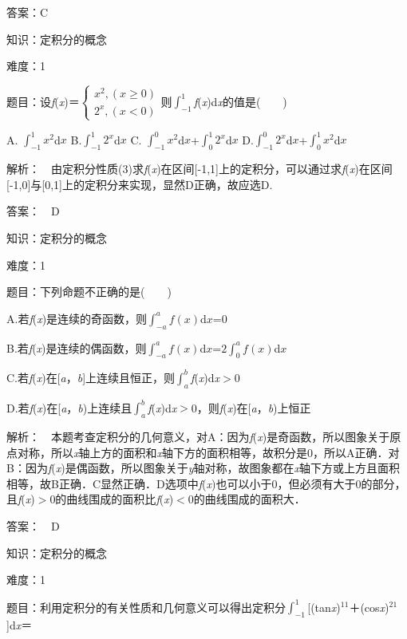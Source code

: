 \documentclass{article} %
\begin{document}
 答案：C



 知识：定积分的概念

 难度：1

 题目：设\textit{f}(\textit{x})＝$\left\{\begin{array}{l} x^2, (x\ge 0)\\ 2^x, (x<0) \end{array}\right.$则$\int_{-1}^1$\textit{f}(\textit{x})d\textit{x}的值是(　　)

A. $\int_{-1}^{1}x^2$d$x$   B.$\int_{-1}^{1}2^x$d$x$
C. $\int_{-1}^{0}x^2$d$x$+$\int_{0}^{1}2^x$d$x$    D.$\int_{-1}^{0}2^x$d$x$+$\int_{0}^{1}x^2$d$x$


 解析：　由定积分性质(3)求\textit{f}(\textit{x})在区间[-1,1]上的定积分，可以通过求\textit{f}(\textit{x})在区间[-1,0]与[0,1]上的定积分来实现，显然D正确，故应选D.

 答案：　D



 知识：定积分的概念

 难度：1

 题目：下列命题不正确的是(　　)

A.若\textit{f}(\textit{x})是连续的奇函数，则$\int_{-a}^{a}f(x)$d$x$=0

B.若\textit{f}(\textit{x})是连续的偶函数，则$\int_{-a}^{a}f(x)$d$x$=$2\int_0^a f(x)$d$x$

C.若\textit{f}(\textit{x})在[\textit{a}，\textit{b}]上连续且恒正，则$\int_a^b$\textit{f}(\textit{x})d\textit{x}$\mathrm{>}$0

D.若\textit{f}(\textit{x})在[\textit{a}，\textit{b})上连续且$\int_a^b$\textit{f}(\textit{x})d\textit{x}$\mathrm{>}$0，则\textit{f}(\textit{x})在[\textit{a}，\textit{b})上恒正

 解析：　本题考查定积分的几何意义，对A：因为\textit{f}(\textit{x})是奇函数，所以图象关于原点对称，所以\textit{x}轴上方的面积和\textit{x}轴下方的面积相等，故积分是0，所以A正确．对B：因为\textit{f}(\textit{x})是偶函数，所以图象关于\textit{y}轴对称，故图象都在\textit{x}轴下方或上方且面积相等，故B正确．C显然正确．D选项中\textit{f}(\textit{x})也可以小于0，但必须有大于0的部分，且\textit{f}(\textit{x})$\mathrm{>}$0的曲线围成的面积比\textit{f}(\textit{x})$\mathrm{<}$0的曲线围成的面积大．

 答案：　D



 知识：定积分的概念

 难度：1

 题目：利用定积分的有关性质和几何意义可以得出定积分$\int_{-1}^1$[(tan\textit{x})${}^{11}$＋(cos\textit{x})${}^{21}$]d\textit{x}＝
\end{document}
